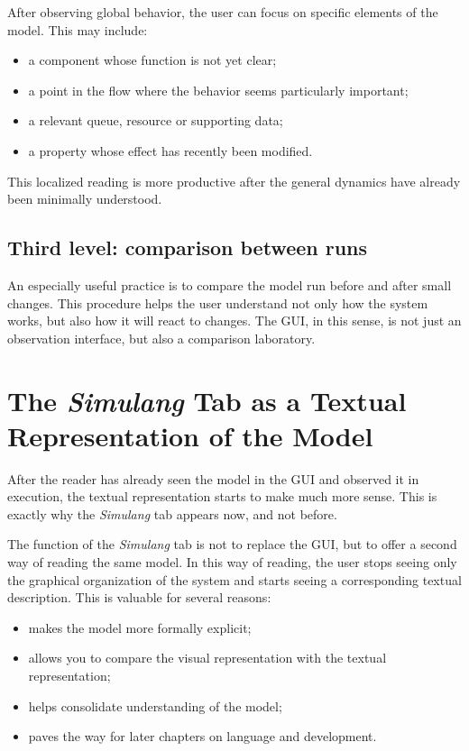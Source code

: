 After observing global behavior, the user can focus on specific elements of the model. This may include:
\begin{itemize}
\item a component whose function is not yet clear;
\item a point in the flow where the behavior seems particularly important;
\item a relevant queue, resource or supporting data;
\item a property whose effect has recently been modified.
\end{itemize}

This localized reading is more productive after the general dynamics have already been minimally understood.

\subsection{Third level: comparison between runs}
\label{subsec:cap5_terceiro_nivel_comparacao_execucoes}

An especially useful practice is to compare the model run before and after small changes. This procedure helps the user understand not only how the system works, but also how it will react to changes. The GUI, in this sense, is not just an observation interface, but also a comparison laboratory.

\section{The \textit{Simulang} Tab as a Textual Representation of the Model}
\label{sec:cap5_aba_simulang}

After the reader has already seen the model in the GUI and observed it in execution, the textual representation starts to make much more sense. This is exactly why the \textit{Simulang} tab appears now, and not before.

The function of the \textit{Simulang} tab is not to replace the GUI, but to offer a second way of reading the same model. In this way of reading, the user stops seeing only the graphical organization of the system and starts seeing a corresponding textual description. This is valuable for several reasons:

\begin{itemize}
\item makes the model more formally explicit;
\item allows you to compare the visual representation with the textual representation;
\item helps consolidate understanding of the model;
\item paves the way for later chapters on language and development.
\end{itemize}

